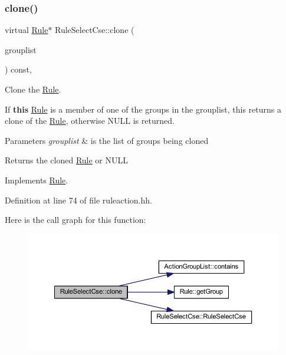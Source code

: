 \subsubsection{\texorpdfstring{clone()}{clone()}}
{\footnotesize\ttfamily virtual \mbox{\hyperlink{class_rule}{Rule}}$\ast$ Rule\+Select\+Cse\+::clone (\begin{DoxyParamCaption}\item[{const \mbox{\hyperlink{class_action_group_list}{Action\+Group\+List}} \&}]{grouplist }\end{DoxyParamCaption}) const\hspace{0.3cm}{\ttfamily [inline]}, {\ttfamily [virtual]}}



Clone the \mbox{\hyperlink{class_rule}{Rule}}. 

If {\bfseries{this}} \mbox{\hyperlink{class_rule}{Rule}} is a member of one of the groups in the grouplist, this returns a clone of the \mbox{\hyperlink{class_rule}{Rule}}, otherwise N\+U\+LL is returned. 
\begin{DoxyParams}{Parameters}
{\em grouplist} & is the list of groups being cloned \\
\hline
\end{DoxyParams}
\begin{DoxyReturn}{Returns}
the cloned \mbox{\hyperlink{class_rule}{Rule}} or N\+U\+LL 
\end{DoxyReturn}


Implements \mbox{\hyperlink{class_rule_a70de90a76461bfa7ea0b575ce3c11e4d}{Rule}}.



Definition at line 74 of file ruleaction.\+hh.

Here is the call graph for this function\+:
\nopagebreak
\begin{figure}[H]
\begin{center}
\leavevmode
\includegraphics[width=350pt]{class_rule_select_cse_ab2c0796a0126999042fd074de0e379fb_cgraph}
\end{center}
\end{figure}
\mbox{\label{class_rule_select_cse_ac80eb4274ae96abff206fa852d61d0cc}} 
